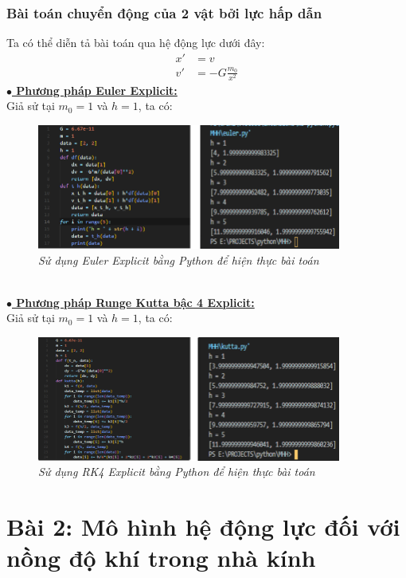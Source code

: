 \documentclass[13pt,a4paper]{article}
\begin{document}
			\subsubsection{Bài toán chuyển động của 2 vật bởi lực hấp dẫn}
				Ta có thể diễn tả bài toán qua hệ động lực dưới đây:
				\begin{align*}
					x' &= v \\
					v' &= -G\frac{m_0}{x^2}
				\end{align*}
				\textbf{\underline{$\bullet$ Phương pháp Euler Explicit:}} \\
					Giả sử tại $m_0 = 1$ và $h = 1$, ta có:
					\begin{figure}[h!]
						\begin{center}
							\includegraphics[width=10cm]{vd2_euler.png}
							\caption{\textit{Sử dụng Euler Explicit bằng Python để hiện thực bài toán}}
						\end{center}
					\end{figure}
				\\
				\textbf{\underline{$\bullet$ Phương pháp Runge Kutta bậc 4 Explicit:}} \\
					Giả sử tại $m_0 = 1$ và $h = 1$, ta có:
					\begin{figure}[h!]
						\begin{center}
							\includegraphics[width=10cm]{vd2_kutta.png}
							\caption{\textit{Sử dụng RK4 Explicit bằng Python để hiện thực bài toán}}
						\end{center}
					\end{figure}
	\section{Bài 2: Mô hình hệ động lực đối với nồng độ khí  trong nhà kính}						
\end{document}

